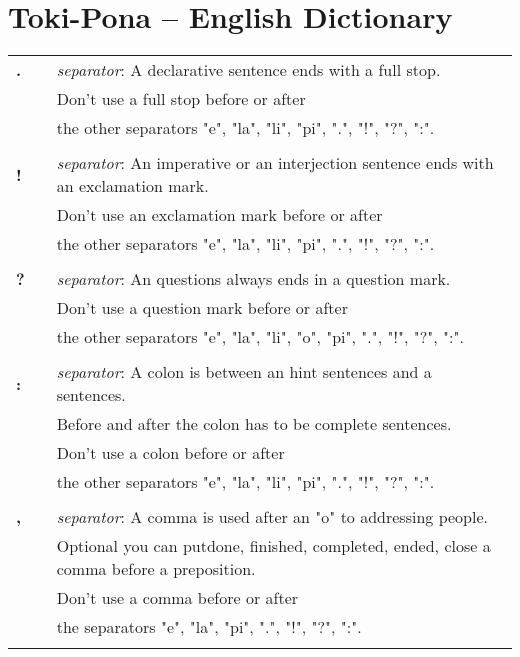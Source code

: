 \section{Toki-Pona -- English Dictionary}
\label{'dict'}
%
\begin{supertabular}{p{2,5cm}|ll}
\textbf{.} && \textit{separator}: A declarative sentence ends with a full stop. \\ && Don't use a full stop before or after \\ && the other separators "e", "la", "li", "pi", ".", "!", "?", ":". \\ 
 && \\ %
\textbf{!} && \textit{separator}: An imperative or an interjection sentence ends with an exclamation mark. \\ && Don't use an exclamation mark before or after \\ && the other separators "e", "la", "li", "pi", ".", "!", "?", ":".  \\ 
 && \\ %
\textbf{?} && \textit{separator}: An questions always ends in a question mark. \\ && Don't use a question mark before or after \\ && the other separators "e", "la", "li", "o", "pi", ".", "!", "?", ":". \\
 && \\ %
\textbf{:} && \textit{separator}: A colon is between an hint sentences and a sentences. \\  && Before and after the colon has to be complete sentences.  \\  && Don't use a colon before or after \\ && the other separators "e", "la", "li", "pi", ".", "!", "?", ":".   \\ 
 && \\ %
\textbf{,} && \textit{separator}: A comma is used after an "o" to addressing people. \\ &&  Optional you can putdone, finished, completed, ended, close a comma before a preposition. \\ && Don't use a comma before or after \\ && the separators "e", "la", "pi", ".", "!", "?", ":".  \\ 
 && \\ %

\end{supertabular}
